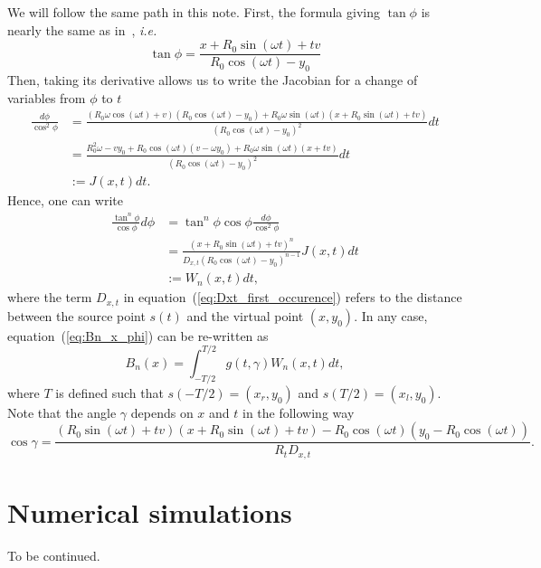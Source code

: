 \documentclass[a4paper]{article}
\numberwithin{equation}{section}
\begin{document}
We will follow the same path in this note. First, the formula giving $\tan \phi$ is nearly the same as in~\cite{clackdoyle2015consistency}, \emph{i.e.}
$$
\tan \phi = \frac{x + R_0 \sin(\omega t) + tv}{R_0 \cos(\omega t) - y_0}
$$
Then, taking its derivative allows us to write the Jacobian for a change of variables from $\phi$ to $t$
\begin{align*}
\frac{d\phi}{\cos^2 \phi} &= \frac{ \left( R_0 \omega \cos(\omega t) +v \right) \left( R_0 \cos(\omega t) - y_0 \right) + R_0 \omega \sin(\omega t) \left( x + R_0 \sin(\omega t) + tv \right) }{ \left( R_0 \cos(\omega t) - y_0 \right)^2 } dt \\
 &= \frac{ R_0^2 \omega - v y_0 + R_0 \cos(\omega t)(v-\omega y_0) + R_0 \omega \sin(\omega t)(x +tv) }{ \left( R_0 \cos(\omega t) - y_0 \right)^2 } dt\\
 &:= J(x,t) dt.
\end{align*}
Hence, one can write
\begin{align}
	\frac{\tan^n \phi}{\cos \phi} d\phi &= \tan^n \phi \cos \phi \frac{d\phi}{\cos^2 \phi} \\
	&= \frac{ \left( x+R_0 \sin(\omega t) + tv \right)^n }{D_{x,t} \left( R_0 \cos(\omega t) - y_0 \right)^{n-1}} J(x,t) dt \label{eq:Dxt_first_occurence} \\
	&:= W_n(x,t) dt,
\end{align}
where the term $D_{x,t}$ in equation~(\ref{eq:Dxt_first_occurence}) refers to the distance between the source point $s(t)$ and the virtual point $(x,y_0)$.
In any case, equation~(\ref{eq:Bn_x_phi}) can be re-written as
\begin{equation}
	B_n(x) = \int_{-T/2}^{T/2} g(t,\gamma) W_n(x,t) dt,
\end{equation}
where $T$ is defined such that $s(-T/2) = \left(x_r,y_0\right) $ and $s(T/2) = \left(x_l,y_0\right)$. Note that the angle $\gamma$ depends on $x$ and $t$ in the following way
\begin{equation}
	\cos \gamma = \frac{\left(R_0 \sin (\omega t) + tv \right) \left(x + R_0 \sin (\omega t) + tv \right) - R_0 \cos (\omega t) \left( y_0 - R_0 \cos(\omega t) \right)}{R_t D_{x,t}}.
\end{equation}

\section{Numerical simulations}

To be continued.



\end{document}

